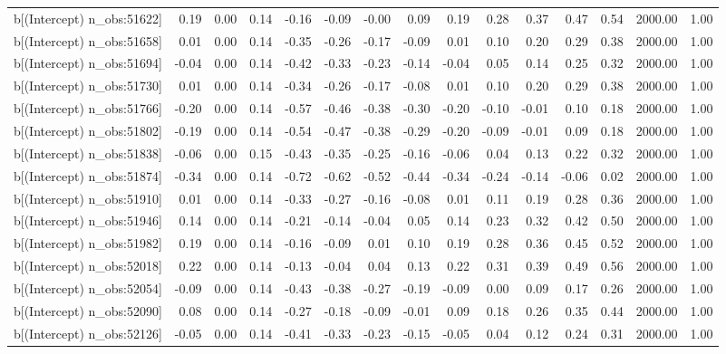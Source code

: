 \begin{table}[ht]
\begin{tabular}{rrrrrrrrrrrrrrr}
  b[(Intercept) n\_obs:51622] & 0.19 & 0.00 & 0.14 & -0.16 & -0.09 & -0.00 & 0.09 & 0.19 & 0.28 & 0.37 & 0.47 & 0.54 & 2000.00 & 1.00 \\ 
  b[(Intercept) n\_obs:51658] & 0.01 & 0.00 & 0.14 & -0.35 & -0.26 & -0.17 & -0.09 & 0.01 & 0.10 & 0.20 & 0.29 & 0.38 & 2000.00 & 1.00 \\ 
  b[(Intercept) n\_obs:51694] & -0.04 & 0.00 & 0.14 & -0.42 & -0.33 & -0.23 & -0.14 & -0.04 & 0.05 & 0.14 & 0.25 & 0.32 & 2000.00 & 1.00 \\ 
  b[(Intercept) n\_obs:51730] & 0.01 & 0.00 & 0.14 & -0.34 & -0.26 & -0.17 & -0.08 & 0.01 & 0.10 & 0.20 & 0.29 & 0.38 & 2000.00 & 1.00 \\ 
  b[(Intercept) n\_obs:51766] & -0.20 & 0.00 & 0.14 & -0.57 & -0.46 & -0.38 & -0.30 & -0.20 & -0.10 & -0.01 & 0.10 & 0.18 & 2000.00 & 1.00 \\ 
  b[(Intercept) n\_obs:51802] & -0.19 & 0.00 & 0.14 & -0.54 & -0.47 & -0.38 & -0.29 & -0.20 & -0.09 & -0.01 & 0.09 & 0.18 & 2000.00 & 1.00 \\ 
  b[(Intercept) n\_obs:51838] & -0.06 & 0.00 & 0.15 & -0.43 & -0.35 & -0.25 & -0.16 & -0.06 & 0.04 & 0.13 & 0.22 & 0.32 & 2000.00 & 1.00 \\ 
  b[(Intercept) n\_obs:51874] & -0.34 & 0.00 & 0.14 & -0.72 & -0.62 & -0.52 & -0.44 & -0.34 & -0.24 & -0.14 & -0.06 & 0.02 & 2000.00 & 1.00 \\ 
  b[(Intercept) n\_obs:51910] & 0.01 & 0.00 & 0.14 & -0.33 & -0.27 & -0.16 & -0.08 & 0.01 & 0.11 & 0.19 & 0.28 & 0.36 & 2000.00 & 1.00 \\ 
  b[(Intercept) n\_obs:51946] & 0.14 & 0.00 & 0.14 & -0.21 & -0.14 & -0.04 & 0.05 & 0.14 & 0.23 & 0.32 & 0.42 & 0.50 & 2000.00 & 1.00 \\ 
  b[(Intercept) n\_obs:51982] & 0.19 & 0.00 & 0.14 & -0.16 & -0.09 & 0.01 & 0.10 & 0.19 & 0.28 & 0.36 & 0.45 & 0.52 & 2000.00 & 1.00 \\ 
  b[(Intercept) n\_obs:52018] & 0.22 & 0.00 & 0.14 & -0.13 & -0.04 & 0.04 & 0.13 & 0.22 & 0.31 & 0.39 & 0.49 & 0.56 & 2000.00 & 1.00 \\ 
  b[(Intercept) n\_obs:52054] & -0.09 & 0.00 & 0.14 & -0.43 & -0.38 & -0.27 & -0.19 & -0.09 & 0.00 & 0.09 & 0.17 & 0.26 & 2000.00 & 1.00 \\ 
  b[(Intercept) n\_obs:52090] & 0.08 & 0.00 & 0.14 & -0.27 & -0.18 & -0.09 & -0.01 & 0.09 & 0.18 & 0.26 & 0.35 & 0.44 & 2000.00 & 1.00 \\ 
  b[(Intercept) n\_obs:52126] & -0.05 & 0.00 & 0.14 & -0.41 & -0.33 & -0.23 & -0.15 & -0.05 & 0.04 & 0.12 & 0.24 & 0.31 & 2000.00 & 1.00 \\ 

\end{tabular}
\end{table}
